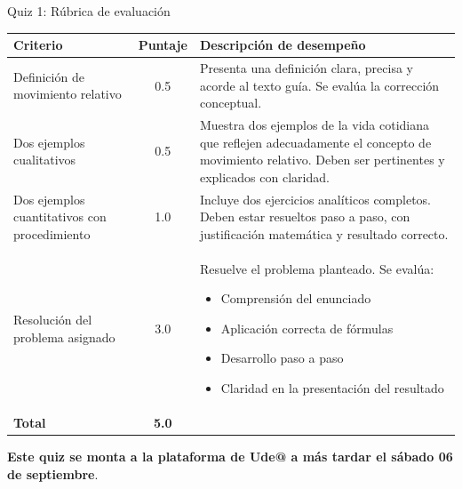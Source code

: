 \begin{frame}{Quiz 1: Rúbrica de evaluación}
\tiny
    \begin{table}[H]
\centering
\renewcommand{\arraystretch}{1.4}
\begin{tabular}{|M{2cm}|c|m{7cm}|}
\hline
\textbf{Criterio} & \textbf{Puntaje} & \textbf{Descripción de desempeño} \\ \hline
Definición de movimiento relativo & 0.5 & Presenta una definición clara, precisa y acorde al texto guía. Se evalúa la corrección conceptual. \\ \hline
Dos ejemplos cualitativos & 0.5 & Muestra dos ejemplos de la vida cotidiana que reflejen adecuadamente el concepto de movimiento relativo. Deben ser pertinentes y explicados con claridad. \\ \hline
Dos ejemplos cuantitativos con procedimiento & 1.0 & Incluye dos ejercicios analíticos completos. Deben estar resueltos paso a paso, con justificación matemática y resultado correcto. \\ \hline
Resolución del problema asignado & 3.0 & Resuelve el problema planteado. Se evalúa: \begin{itemize}
    \item Comprensión del enunciado
    \item Aplicación correcta de fórmulas
    \item Desarrollo paso a paso
    \item Claridad en la presentación del resultado
\end{itemize} \\ \hline
\textbf{Total} & \textbf{5.0} & \\ \hline
\end{tabular}
\end{table}

\begin{center}
    \textbf{\large Este quiz se monta a la plataforma de Ude@ a más tardar el sábado 06 de septiembre}.
\end{center}

\end{frame}
